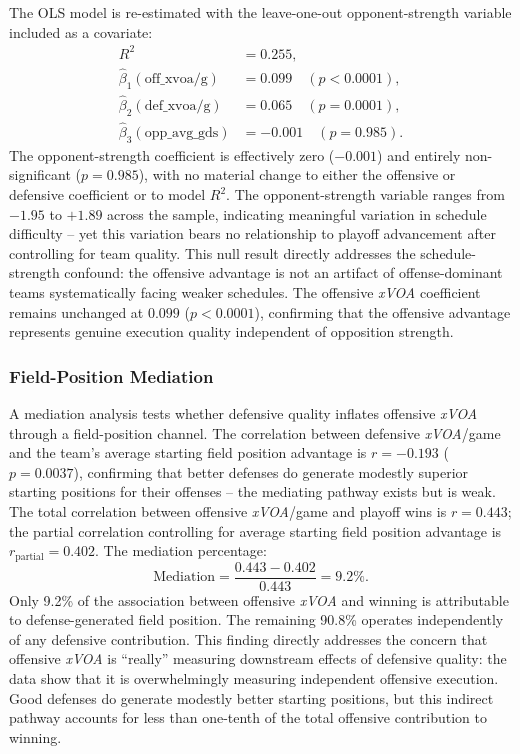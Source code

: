 \documentclass[12pt,a4paper]{article}
\newcommand{\xvoa}{\textit{xVOA}}
\begin{document}
The OLS model is re-estimated with the leave-one-out opponent-strength variable included as a covariate:
\begin{align*}
  R^2 &= 0.255, \\
  \hat{\beta}_1(\text{off\_xvoa/g}) &= 0.099 \quad (p < 0.0001), \\
  \hat{\beta}_2(\text{def\_xvoa/g}) &= 0.065 \quad (p = 0.0001), \\
  \hat{\beta}_3(\text{opp\_avg\_gds}) &= -0.001 \quad (p = 0.985).
\end{align*}
The opponent-strength coefficient is effectively zero ($-0.001$) and entirely non-significant ($p = 0.985$), with no material change to either the offensive or defensive coefficient or to model $R^2$. The opponent-strength variable ranges from $-1.95$ to $+1.89$ across the sample, indicating meaningful variation in schedule difficulty -- yet this variation bears no relationship to playoff advancement after controlling for team quality. This null result directly addresses the schedule-strength confound: the offensive advantage is not an artifact of offense-dominant teams systematically facing weaker schedules. The offensive \xvoa{} coefficient remains unchanged at $0.099$ ($p < 0.0001$), confirming that the offensive advantage represents genuine execution quality independent of opposition strength.

\subsubsection{Field-Position Mediation}

A mediation analysis tests whether defensive quality inflates offensive \xvoa{} through a field-position channel. The correlation between defensive \xvoa{}/game and the team's average starting field position advantage is $r = -0.193$ ($p = 0.0037$), confirming that better defenses do generate modestly superior starting positions for their offenses -- the mediating pathway exists but is weak. The total correlation between offensive \xvoa{}/game and playoff wins is $r = 0.443$; the partial correlation controlling for average starting field position advantage is $r_{\mathrm{partial}} = 0.402$. The mediation percentage:
\[
  \text{Mediation} = \frac{0.443 - 0.402}{0.443} = 9.2\%.
\]
Only 9.2\% of the association between offensive \xvoa{} and winning is attributable to defense-generated field position. The remaining 90.8\% operates independently of any defensive contribution. This finding directly addresses the concern that offensive \xvoa{} is ``really'' measuring downstream effects of defensive quality: the data show that it is overwhelmingly measuring independent offensive execution. Good defenses do generate modestly better starting positions, but this indirect pathway accounts for less than one-tenth of the total offensive contribution to winning.
\end{document}
